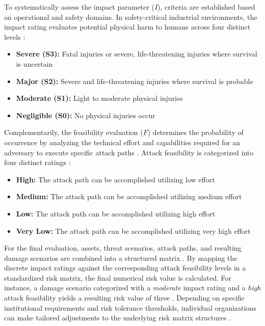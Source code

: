 To systematically assess the impact parameter ($I$), criteria are established based on operational and safety domains. In safety-critical industrial environments, the impact rating evaluates potential physical harm to humans across four distinct levels \cite[p. 106]{doCarmo2025}:
\begin{itemize}
	\item \textbf{Severe (S3):} Fatal injuries or severe, life-threatening injuries where survival is uncertain
	\item \textbf{Major (S2):} Severe and life-threatening injuries where survival is probable
	\item \textbf{Moderate (S1):} Light to moderate physical injuries
	\item \textbf{Negligible (S0):} No physical injuries occur
\end{itemize}

Complementarily, the feasibility evaluation ($F$) determines the probability of occurrence by analyzing the technical effort and capabilities required for an adversary to execute specific attack paths \cite[p. 135]{doCarmo2025}. Attack feasibility is categorized into four distinct ratings \cite[p. 151]{doCarmo2025}:
\begin{itemize}
	\item \textbf{High:} The attack path can be accomplished utilizing low effort
	\item \textbf{Medium:} The attack path can be accomplished utilizing medium effort
	\item \textbf{Low:} The attack path can be accomplished utilizing high effort
	\item \textbf{Very Low:} The attack path can be accomplished utilizing very high effort
\end{itemize}

For the final evaluation, assets, threat scenarios, attack paths, and resulting damage scenarios are combined into a structured matrix \cite[p. 180]{doCarmo2025}. By mapping the discrete impact ratings against the corresponding attack feasibility levels in a standardized risk matrix, the final numerical risk value is calculated. For instance, a damage scenario categorized with a \textit{moderate} impact rating and a \textit{high} attack feasibility yields a resulting risk value of three \cite[p. 180]{doCarmo2025}. Depending on specific institutional requirements and risk tolerance thresholds, individual organizations can make tailored adjustments to the underlying risk matrix structures \cite[p. 182]{doCarmo2025}.




